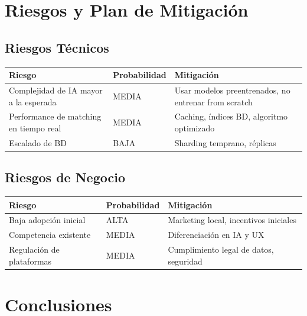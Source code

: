 \documentclass[12pt,a4paper,spanish]{article}
\begin{document}
\section{Riesgos y Plan de Mitigación}

\subsection{Riesgos Técnicos}

\begin{center}
\begin{tabular}{|p{3cm}|p{3cm}|p{4cm}|}
    \toprule
    \textbf{Riesgo} & \textbf{Probabilidad} & \textbf{Mitigación} \\
    \midrule
    Complejidad de IA mayor a la esperada & MEDIA & Usar modelos preentrenados, no entrenar from scratch \\
    Performance de matching en tiempo real & MEDIA & Caching, índices BD, algoritmo optimizado \\
    Escalado de BD & BAJA & Sharding temprano, réplicas \\
    \bottomrule
\end{tabular}
\end{center}

\subsection{Riesgos de Negocio}

\begin{center}
\begin{tabular}{|p{3cm}|p{3cm}|p{4cm}|}
    \toprule
    \textbf{Riesgo} & \textbf{Probabilidad} & \textbf{Mitigación} \\
    \midrule
    Baja adopción inicial & ALTA & Marketing local, incentivos iniciales \\
    Competencia existente & MEDIA & Diferenciación en IA y UX \\
    Regulación de plataformas & MEDIA & Cumplimiento legal de datos, seguridad \\
    \bottomrule
\end{tabular}
\end{center}

\newpage

\section{Conclusiones}
\end{document}
